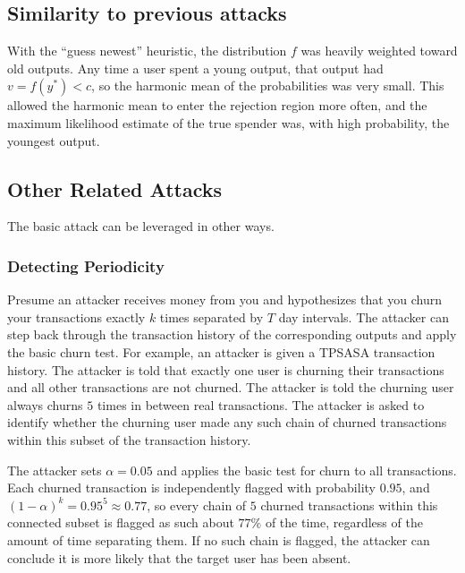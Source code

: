 \documentclass{tran-l}
\theoremstyle{cor}
\theoremstyle{definition}
\theoremstyle{remark}
\theoremstyle{conjecture}
\numberwithin{equation}{section}
\begin{document}
\subsection{Similarity to previous attacks}\label{sec:test_attack_similarity}

With the ``guess newest'' heuristic, the distribution $f$ was heavily weighted toward old outputs.
Any time a user spent a young output, that output had $v = f(y^*) < c$, so the harmonic mean of the probabilities was very small.
This allowed the harmonic mean to enter the rejection region more often, and the maximum likelihood estimate of the true spender was, with high probability, the youngest output.

\subsection{Other Related Attacks}

The basic attack can be leveraged in other ways.

\subsubsection{Detecting Periodicity}

Presume an attacker receives money from you and hypothesizes that you churn your transactions exactly $k$ times separated by $T$ day intervals.
The attacker can step back through the transaction history of the corresponding outputs and apply the basic churn test.
For example, an attacker is given a TPSASA transaction history.
The attacker is told that exactly one user is churning their transactions and all other transactions are not churned.
The attacker is told the churning user always churns $5$ times in between real transactions.
The attacker is asked to identify whether the churning user made any such chain of churned transactions within this subset of the transaction history.

The attacker sets $\alpha = 0.05$ and applies the basic test for churn to all transactions.
Each churned transaction is independently flagged with probability $0.95$, and $(1-\alpha)^k = 0.95^5 \approx 0.77$, so every chain of $5$ churned transactions within this connected subset is flagged as such about $77\%$ of the time, regardless of the amount of time separating them.
If no such chain is flagged, the attacker can conclude it is more likely that the target user has been absent.
\end{document}
